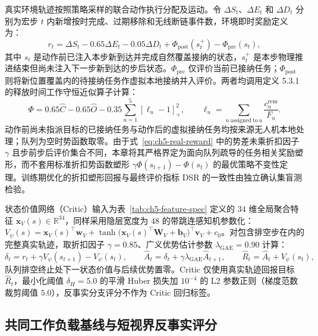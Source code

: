真实环境轨迹按照策略采样的联合动作执行分配及运动。令 $\Delta S_t$、$\Delta E_t$ 和 $\Delta D_t$ 分别为宏步 $t$ 内新增按时完成、过期移除和无线断链事件数，环境即时奖励定义为：
\begin{equation}
 r_t=\Delta S_t-0.65\Delta E_t-0.05\Delta D_t
 +\Phi_{\mathrm{post}}(s_t^+)-\Phi_{\mathrm{pre}}(s_t),
 \label{eq:ch5-real-reward}
\end{equation}
其中 $s_t$ 是动作前已注入本步新到达并完成自然覆盖接纳的状态，$s_t^+$ 是本步物理推进结束但尚未注入下一步新到达的步后状态。$\Phi_{\mathrm{pre}}$ 仅评价当前已接纳任务；$\Phi_{\mathrm{post}}$ 则将新位置覆盖内的待接纳任务作虚拟本地接纳并入评价。两者均调用定义 5.3.1 的释放时间工作守恒近似算子计算：
\begin{equation}
 \Phi=0.65\widehat C-0.65\widehat O
 -0.35\sum_{u=1}^{5}[\ell_u-1]_+^2,\qquad
 \ell_u=\sum_{n\,\mathrm{assigned\ to}\,u}\frac{c_n^{\mathrm{rem}}}{F_u}.
 \label{eq:ch5-potential}
\end{equation}
动作前尚未指派目标的已接纳任务与动作后的虚拟接纳任务均按来源无人机本地处理；队列为空时势函数取零。由于式~\eqref{eq:ch5-real-reward} 中的势差未乘折扣因子 $\gamma$ 且步前步后评价集合不同，本章将其严格界定为面向队列疏导的任务相关奖励塑形，而不套用标准折扣势函数塑形 $\gamma\Phi(s_{t+1})-\Phi(s_t)$ 的最优策略不变性定理\cite{ng1999policy}。训练期优化的折扣塑形回报与最终评价指标 DSR 的一致性由独立确认集盲测检验。

状态价值网络（Critic）输入为表~\ref{tab:ch5-feature-spec} 定义的 $34$ 维全局聚合特征 $\mathbf{x}_V(s)\in\mathbb{R}^{34}$，同样采用隐层宽度为 $48$ 的带跳连感知机参数化：$V_\psi(s)=\mathbf{x}_V(s)^\top\mathbf{w}_V+\tanh\big(\mathbf{x}_V(s)^\top\mathbf{W}_V+\mathbf{b}_V\big)^\top\mathbf{v}_V+c_0$。对包含排空步在内的完整真实轨迹，取折扣因子 $\gamma=0.85$、广义优势估计参数 $\lambda_{\mathrm{GAE}}=0.90$ 计算\cite{schulman2015high}：
\begin{equation}
 \delta_t=r_t+\gamma V_\psi(s_{t+1})-V_\psi(s_t),\qquad
 \widehat A_t=\delta_t+\gamma\lambda_{\mathrm{GAE}}\widehat A_{t+1},\qquad
 \widehat R_t=\widehat A_t+V_\psi(s_t),
 \label{eq:ch5-gae}
\end{equation}
队列排空终止处下一状态价值与后续优势置零。Critic 仅使用真实轨迹回报目标 $\widehat R_t$，最小化阈值 $\delta_H=5.0$ 的平滑 Huber 损失加 $10^{-4}$ 的 L2 参数正则（梯度范数裁剪阈值 $5.0$），反事实分支评分不作为 Critic 回归标签。

\subsection{共同工作负载基线与短视界反事实评分}


